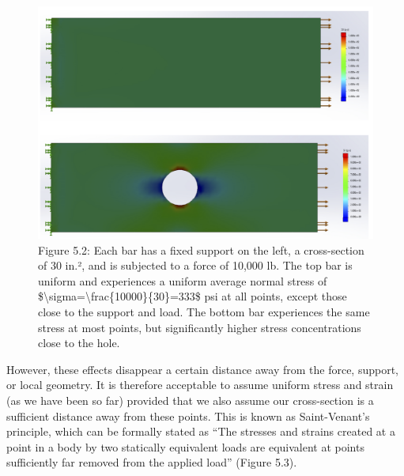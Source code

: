 \documentclass[
  letterpaper,
  DIV=11,
  numbers=noendperiod]{scrreprt}
\begin{document}
\begin{figure}[H]

{\centering \includegraphics[width=5.89583in,height=\textheight]{images/PNGs/Figure 5.2.png}

}

\caption{Figure 5.2: Each bar has a fixed support on the left, a
cross-section of 30 in.², and is subjected to a force of 10,000 lb. The
top bar is uniform and experiences a uniform average normal stress of
\$\textbackslash sigma=\textbackslash frac\{10000\}\{30\}=333\$ psi at
all points, except those close to the support and load. The bottom bar
experiences the same stress at most points, but significantly higher
stress concentrations close to the hole.}

\end{figure}%

However, these effects disappear a certain distance away from the force,
support, or local geometry. It is therefore acceptable to assume uniform
stress and strain (as we have been so far) provided that we also assume
our cross-section is a sufficient distance away from these points. This
is known as Saint-Venant's principle, which can be formally stated as
``The stresses and strains created at a point in a body by two
statically equivalent loads are equivalent at points sufficiently far
removed from the applied load'' (Figure 5.3).
\end{document}
